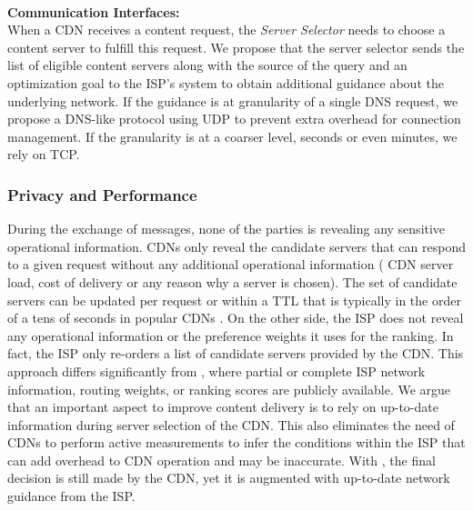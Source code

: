 \ \\\noindent\textbf{Communication Interfaces:}\label{sec:Communication-interfaces}\\\noindent
When a CDN receives a content request, the {\it Server Selector} needs to
choose a content server to fulfill this request. We propose that the server
selector sends the list of eligible content servers along with the source of
the query and an optimization goal to the ISP's \cate system to obtain
additional guidance about the underlying network.  If the guidance is at
granularity of a single DNS request, we propose a DNS-like protocol using UDP
to prevent extra overhead for connection management.  If the granularity is at
a coarser level, \ie seconds or even minutes, we rely on TCP.


\subsubsection{Privacy and Performance}\label{sec:discussion}
During the exchange of messages, none of the parties is revealing any sensitive
operational information.  CDNs only reveal the candidate servers that can
respond to a given request without any additional operational information (\eg
CDN server load, cost of delivery or any reason why a server is chosen). The
set of candidate servers can be updated per request or within a TTL that is
typically in the order of a tens of seconds in popular CDNs \cite{PADIS2010}.
On the other side, the ISP does not reveal any operational information or the
preference weights it uses for the ranking. In fact, the ISP only re-orders a
list of candidate servers provided by the CDN.  This approach differs
significantly from \cite{ietf-alto-protocol,p4p}, where partial or complete
ISP network information, routing weights, or ranking scores are publicly
available.  We argue that an important aspect to improve content delivery is to
rely on up-to-date information during server selection of the CDN.  This also
eliminates the need of CDNs to perform active measurements to infer the
conditions within the ISP that can add overhead to CDN operation and may be
inaccurate.  With \cate, the final decision is still made by the CDN, yet it is
augmented with up-to-date network guidance from the ISP.

